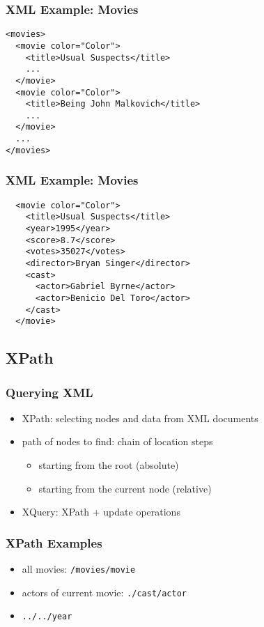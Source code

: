 \documentclass[dvipsnames]{beamer}
\theoremstyle{plain}
\begin{document}
\begin{frame}[fragile]
  \frametitle{XML Example: Movies}

  \begin{lstlisting}
<movies>
  <movie color="Color">
    <title>Usual Suspects</title>
    ...
  </movie>
  <movie color="Color">
    <title>Being John Malkovich</title>
    ...
  </movie>
  ...
</movies>
  \end{lstlisting}
\end{frame}

\begin{frame}[fragile]
  \frametitle{XML Example: Movies}

  \begin{lstlisting}
  <movie color="Color">
    <title>Usual Suspects</title>
    <year>1995</year>
    <score>8.7</score>
    <votes>35027</votes>
    <director>Bryan Singer</director>
    <cast>
      <actor>Gabriel Byrne</actor>
      <actor>Benicio Del Toro</actor>
    </cast>
  </movie>
  \end{lstlisting}
\end{frame}

\subsection{XPath}

\begin{frame}
  \frametitle{Querying XML}

  \begin{itemize}
    \item XPath: selecting nodes and data from XML documents
    \item path of nodes to find: chain of location steps
    \begin{itemize}
      \item starting from the root (absolute)
      \item starting from the current node (relative)
    \end{itemize}

    \medskip
    \item XQuery: XPath + update operations
  \end{itemize}
\end{frame}

\begin{frame}
  \frametitle{XPath Examples}

  \begin{itemize}
    \item all movies: \lstinline|/movies/movie|
    \item actors of current movie: \lstinline|./cast/actor|
    \item \lstinline|../../year|
  \end{itemize}
\end{frame}
\end{document}
